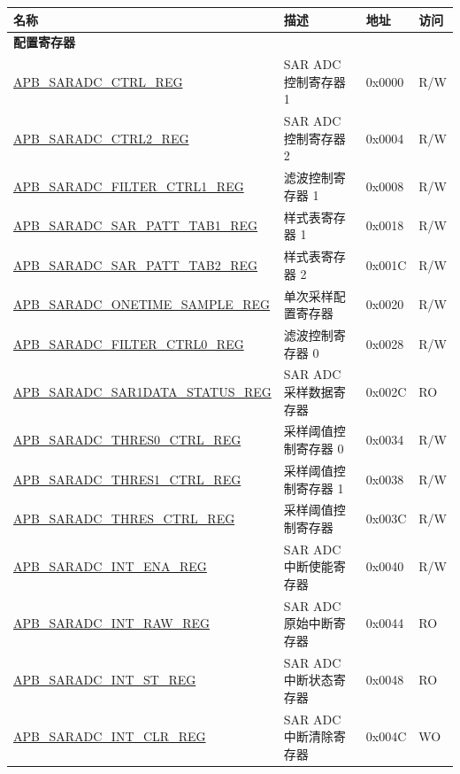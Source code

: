 \begin{longtable}{ | p{7cm} | p{5.2cm} | p{1.3cm} | p{1cm} | }
\hline\rowcolor{lightgray}
名称 & 描述 & 地址 & 访问 \\ \hline
\endhead
\multicolumn{4}{|l|}{\textbf{配置寄存器}} \\ \hline
\hyperref[regdesc:APBSARADCCTRLREG]{APB\_SARADC\_CTRL\_REG} & SAR ADC 控制寄存器 1 & 0x0000 & R/W \\ \hline
\hyperref[regdesc:APBSARADCCTRL2REG]{APB\_SARADC\_CTRL2\_REG} & SAR ADC 控制寄存器 2 & 0x0004 & R/W \\ \hline
\hyperref[regdesc:APBSARADCFILTERCTRL1REG]{APB\_SARADC\_FILTER\_CTRL1\_REG} & 滤波控制寄存器 1 & 0x0008 & R/W \\ \hline
\hyperref[regdesc:APBSARADCSARPATTTAB1REG]{APB\_SARADC\_SAR\_PATT\_TAB1\_REG} & 样式表寄存器 1 & 0x0018 & R/W \\ \hline
\hyperref[regdesc:APBSARADCSARPATTTAB2REG]{APB\_SARADC\_SAR\_PATT\_TAB2\_REG} & 样式表寄存器 2 & 0x001C & R/W \\ \hline
\hyperref[regdesc:APBSARADCONETIMESAMPLEREG]{APB\_SARADC\_ONETIME\_SAMPLE\_REG} & 单次采样配置寄存器 & 0x0020 & R/W \\ \hline
\hyperref[regdesc:APBSARADCFILTERCTRL0REG]{APB\_SARADC\_FILTER\_CTRL0\_REG} & 滤波控制寄存器 0 & 0x0028 & R/W \\ \hline
\hyperref[regdesc:APBSARADCSAR1DATASTATUSREG]{APB\_SARADC\_SAR1DATA\_STATUS\_REG} & SAR ADC 采样数据寄存器 & 0x002C & RO \\ \hline
\hyperref[regdesc:APBSARADCTHRES0CTRLREG]{APB\_SARADC\_THRES0\_CTRL\_REG} & 采样阈值控制寄存器 0 & 0x0034 & R/W \\ \hline
\hyperref[regdesc:APBSARADCTHRES1CTRLREG]{APB\_SARADC\_THRES1\_CTRL\_REG} & 采样阈值控制寄存器 1 & 0x0038 & R/W \\ \hline
\hyperref[regdesc:APBSARADCTHRESCTRLREG]{APB\_SARADC\_THRES\_CTRL\_REG} & 采样阈值控制寄存器 & 0x003C & R/W \\ \hline
\hyperref[regdesc:APBSARADCINTENAREG]{APB\_SARADC\_INT\_ENA\_REG} & SAR ADC 中断使能寄存器 & 0x0040 & R/W \\ \hline
\hyperref[regdesc:APBSARADCINTRAWREG]{APB\_SARADC\_INT\_RAW\_REG} & SAR ADC 原始中断寄存器 & 0x0044 & RO \\ \hline
\hyperref[regdesc:APBSARADCINTSTREG]{APB\_SARADC\_INT\_ST\_REG} & SAR ADC 中断状态寄存器 & 0x0048 & RO \\ \hline
\hyperref[regdesc:APBSARADCINTCLRREG]{APB\_SARADC\_INT\_CLR\_REG} & SAR ADC 中断清除寄存器 & 0x004C & WO \\ \hline

\end{longtable}

